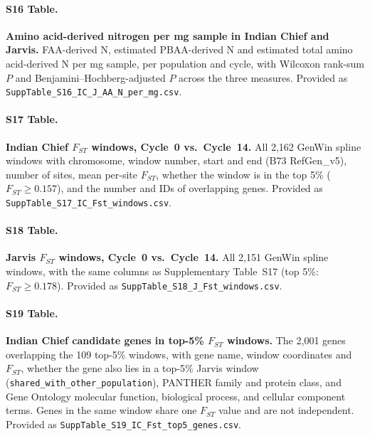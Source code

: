\paragraph*{S16 Table.}
\makeatletter
\def\@currentlabelname{S16 Table}
\makeatother
\label{S16_Table}
\textbf{Amino acid-derived nitrogen per mg sample in Indian Chief and Jarvis.} FAA-derived N, estimated PBAA-derived N and estimated total amino acid-derived N per mg sample, per population and cycle, with Wilcoxon rank-sum $P$ and Benjamini--Hochberg-adjusted $P$ across the three measures. Provided as \texttt{SuppTable\_S16\_IC\_J\_AA\_N\_per\_mg.csv}.

\paragraph*{S17 Table.}
\makeatletter
\def\@currentlabelname{S17 Table}
\makeatother
\label{S17_Table}
\textbf{Indian Chief $F_{ST}$ windows, Cycle~0 vs.\ Cycle~14.} All 2,162 GenWin spline windows with chromosome, window number, start and end (B73 RefGen\_v5), number of sites, mean per-site $F_{ST}$, whether the window is in the top 5\% ($F_{ST} \geq 0.157$), and the number and IDs of overlapping genes. Provided as \texttt{SuppTable\_S17\_IC\_Fst\_windows.csv}.

\paragraph*{S18 Table.}
\makeatletter
\def\@currentlabelname{S18 Table}
\makeatother
\label{S18_Table}
\textbf{Jarvis $F_{ST}$ windows, Cycle~0 vs.\ Cycle~14.} All 2,151 GenWin spline windows, with the same columns as Supplementary Table~S17 (top 5\%: $F_{ST} \geq 0.178$). Provided as \texttt{SuppTable\_S18\_J\_Fst\_windows.csv}.

\paragraph*{S19 Table.}
\makeatletter
\def\@currentlabelname{S19 Table}
\makeatother
\label{S19_Table}
\textbf{Indian Chief candidate genes in top-5\% $F_{ST}$ windows.} The 2,001 genes overlapping the 109 top-5\% windows, with gene name, window coordinates and $F_{ST}$, whether the gene also lies in a top-5\% Jarvis window (\texttt{shared\_with\_other\_population}), PANTHER family and protein class, and Gene Ontology molecular function, biological process, and cellular component terms. Genes in the same window share one $F_{ST}$ value and are not independent. Provided as \texttt{SuppTable\_S19\_IC\_Fst\_top5\_genes.csv}.

